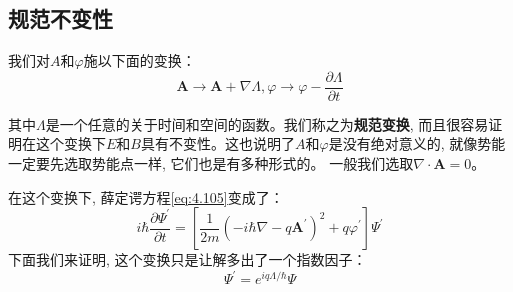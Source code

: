 \documentclass[a4paper,zihao=-4,linespread=1]{ctexrep}
\begin{document}
    \subsection*{规范不变性}
    我们对$A$和$\varphi$施以下面的变换：
    \begin{equation}
        \mathbf{A}\rightarrow\mathbf{A}+\nabla\Lambda,\varphi\rightarrow\varphi-\frac{\partial\Lambda}{\partial t}
    \end{equation}
    
    其中$\Lambda$是一个任意的关于时间和空间的函数。我们称之为\textbf{规范变换}, 而且很容易证明在这个变换下$E$和$B$具有不变性。这也说明了$A$和$\varphi$是没有绝对意义的, 就像势能一定要先选取势能点一样, 它们也是有多种形式的。
    一般我们选取$\nabla\cdot\mathbf{A}=0$。

    在这个变换下, 薛定谔方程\ref{eq:4.105}变成了：
    \begin{equation}
        \label{eq:4.107}
        i\hbar\frac{\partial\Psi^\prime}{\partial t}=\left[\frac{1}{2m}\left(-i\hbar\nabla-q\mathbf{A}^\prime\right)^2+q\varphi^\prime\right]\Psi^\prime
    \end{equation}
    下面我们来证明, 这个变换只是让解多出了一个指数因子：
    \begin{equation}
        \label{eq:4.108}
        \Psi^\prime=e^{iq\Lambda/\hbar}\Psi
    \end{equation}
\end{document}
